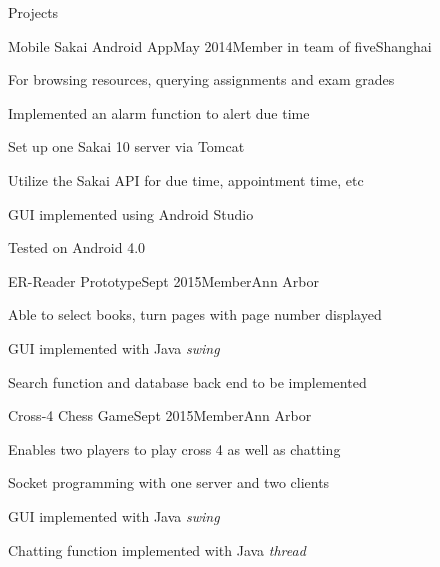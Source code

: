\documentclass{resume} %
\begin{document}
\begin{rSection}{Projects}

	\begin{rSubsection}{Mobile Sakai Android App}{May 2014}{Member in team of five}{Shanghai}
	\item For browsing resources, querying assignments and exam grades
	\item Implemented an alarm function to alert due time
	\item Set up one Sakai 10 server via Tomcat
	\item Utilize the Sakai API for due time, appointment time, etc
	\item GUI implemented using Android Studio
	\item Tested on Android 4.0
	\end{rSubsection}
	
	\begin{rSubsection}{ER-Reader Prototype}{Sept 2015}{Member}{Ann Arbor}
		\item Able to select books, turn pages with page number displayed
		\item GUI implemented with Java \textit{swing}
		\item Search function and database back end to be implemented
	\end{rSubsection}
	
	\begin{rSubsection}{Cross-4 Chess Game}{Sept 2015}{Member}{Ann Arbor}
		\item Enables two players to play cross 4 as well as chatting
		\item Socket programming with one server and two clients
		\item GUI implemented with Java \textit{swing}
		\item Chatting function implemented with Java \textit{thread}		
	\end{rSubsection}

\end{rSection}
%
%	
\end{document}
